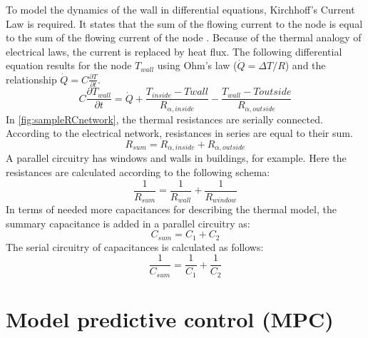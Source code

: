     To model the dynamics of the wall in differential equations, Kirchhoff's Current Law is required. It states that the sum of the flowing current to the node is equal to the sum of the flowing current of the node 
    \cite{Kuchling.2007}. 
    Because of the thermal analogy of electrical laws, the current is replaced by heat flux. The following differential equation results for the node  $T_{wall}$ using Ohm's law ($\dot{Q}=\Delta T/R$) and the relationship $\dot{Q}=C\frac{\partial T}{\partial t}$.     
    \begin{equation}
    \label{eq:sampledifferential}
    C \frac{\partial T_{wall}}{\partial t} = \dot{Q} + \frac{T_{inside}-T{wall}}{R_{\alpha,inside}} - \frac{T_{wall}-T{outside}}{R_{\alpha,outside}}
    \end{equation}
    In \autoref{fig:sampleRCnetwork}, the thermal resistances are serially connected. According to the electrical network, resistances in series are equal to their sum. 
    \begin{equation}
    \label{eq:resistanceseriel}
        R_{sum} = R_{\alpha,inside} + R_{\alpha,outside}
    \end{equation}
    A parallel circuitry has windows and walls in buildings, for example. Here the resistances are calculated according to the following schema:
    \begin{equation}
    \label{eq:resistancesparallel}
        \frac{1}{R_{sum}} = \frac{1}{R_{wall}} + \frac{1}{R_{window}}
    \end{equation}
    In terms of needed more capacitances for describing the thermal model, the summary capacitance is added in a parallel circuitry as: 
    \begin{equation}
    \label{eq:capacityparallel}
         C_{sum} = C_1 + C_2
    \end{equation}
    The serial circuitry of capacitances is calculated as follows:
    \begin{equation}
    \label{eq:capacityseriell}
         \frac{1}{C_{sum}} = \frac{1}{C_1} + \frac{1}{C_2}
    \end{equation}
    


\section{Model predictive control (MPC)}
\label{section:mpc}

